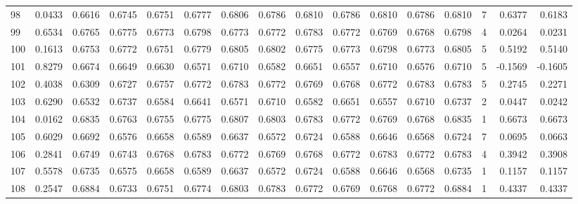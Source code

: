 \begin{tabular}{lrrrrrrrrrrrrrrr}
98  &      0.0433 &  0.6616 &  0.6745 &  0.6751 &  0.6777 &  0.6806 &  0.6786 &  0.6810 &  0.6786 &  0.6810 &   0.6786 &     0.6810 &      7 &                    0.6377 &                     0.6183 \\
99  &      0.6534 &  0.6765 &  0.6775 &  0.6773 &  0.6798 &  0.6773 &  0.6772 &  0.6783 &  0.6772 &  0.6769 &   0.6768 &     0.6798 &      4 &                    0.0264 &                     0.0231 \\
100 &      0.1613 &  0.6753 &  0.6772 &  0.6751 &  0.6779 &  0.6805 &  0.6802 &  0.6775 &  0.6773 &  0.6798 &   0.6773 &     0.6805 &      5 &                    0.5192 &                     0.5140 \\
101 &      0.8279 &  0.6674 &  0.6649 &  0.6630 &  0.6571 &  0.6710 &  0.6582 &  0.6651 &  0.6557 &  0.6710 &   0.6576 &     0.6710 &      5 &                   -0.1569 &                    -0.1605 \\
102 &      0.4038 &  0.6309 &  0.6727 &  0.6757 &  0.6772 &  0.6783 &  0.6772 &  0.6769 &  0.6768 &  0.6772 &   0.6783 &     0.6783 &      5 &                    0.2745 &                     0.2271 \\
103 &      0.6290 &  0.6532 &  0.6737 &  0.6584 &  0.6641 &  0.6571 &  0.6710 &  0.6582 &  0.6651 &  0.6557 &   0.6710 &     0.6737 &      2 &                    0.0447 &                     0.0242 \\
104 &      0.0162 &  0.6835 &  0.6763 &  0.6755 &  0.6775 &  0.6807 &  0.6803 &  0.6783 &  0.6772 &  0.6769 &   0.6768 &     0.6835 &      1 &                    0.6673 &                     0.6673 \\
105 &      0.6029 &  0.6692 &  0.6576 &  0.6658 &  0.6589 &  0.6637 &  0.6572 &  0.6724 &  0.6588 &  0.6646 &   0.6568 &     0.6724 &      7 &                    0.0695 &                     0.0663 \\
106 &      0.2841 &  0.6749 &  0.6743 &  0.6768 &  0.6783 &  0.6772 &  0.6769 &  0.6768 &  0.6772 &  0.6783 &   0.6772 &     0.6783 &      4 &                    0.3942 &                     0.3908 \\
107 &      0.5578 &  0.6735 &  0.6575 &  0.6658 &  0.6589 &  0.6637 &  0.6572 &  0.6724 &  0.6588 &  0.6646 &   0.6568 &     0.6735 &      1 &                    0.1157 &                     0.1157 \\
108 &      0.2547 &  0.6884 &  0.6733 &  0.6751 &  0.6774 &  0.6803 &  0.6783 &  0.6772 &  0.6769 &  0.6768 &   0.6772 &     0.6884 &      1 &                    0.4337 &                     0.4337 \\

\end{tabular}

